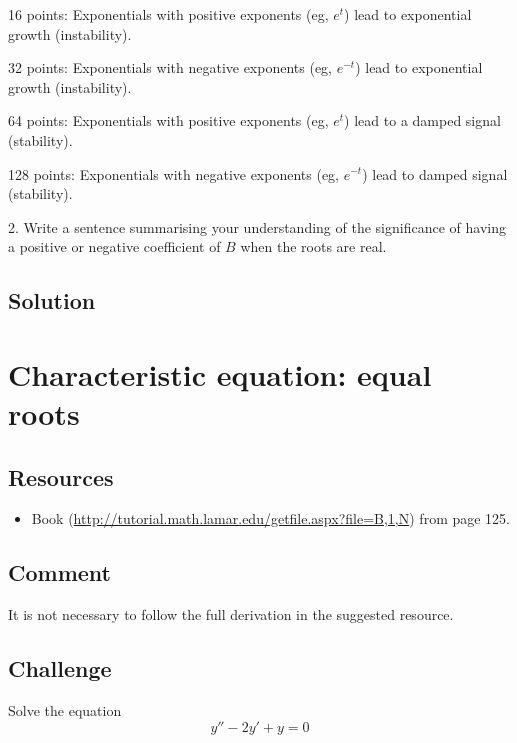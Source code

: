 16 points: Exponentials with positive exponents (eg, $e^{t}$) lead to exponential growth (instability).

32 points: Exponentials with negative exponents (eg, $e^{-t}$) lead to exponential growth (instability).

64 points: Exponentials with positive exponents (eg, $e^{t}$) lead to a damped signal (stability).

128 points: Exponentials with negative exponents (eg, $e^{-t}$) lead to damped signal (stability).

\vspace{2em}

2. Write a sentence summarising your understanding of the significance of having a positive or negative coefficient of $B$ when the roots are real.


\subsection*{Solution}




\newpage
\section{Characteristic equation: equal roots}

\subsection*{Resources}
\begin{itemize}
    \item Book (\url{http://tutorial.math.lamar.edu/getfile.aspx?file=B,1,N}) from page 125.
\end{itemize}

\subsection*{Comment}
It is not necessary to follow the full derivation in the suggested resource.

\subsection*{Challenge}
Solve the equation
\begin{equation}
    y'' - 2y' + y = 0
\end{equation}

